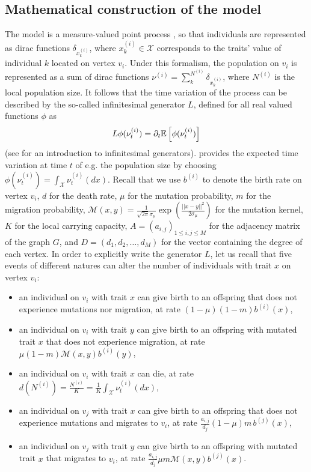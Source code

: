     \subsection{Mathematical construction of the model}\label{secSI:formal_descrip}
    The model is a measure-valued point process \cite{Bansaye2015}, so that individuals are represented as dirac functions $\delta_{x_{k}^{(i)}}$, where $x_{k}^{(i)} \in \mathcal{X}$ corresponds to the traits' value of individual $k$ located on vertex $v_i$.
    Under this formalism, the population on $v_i$ is represented as a sum of dirac functions $\nu^{(i)} = \sum^{N^{(i)}}_k \delta_{x_{k}^{(i)}}$, where $N^{(i)}$ is the local population size. 
    It follows that the time variation of the process can be described by the so-called infinitesimal generator $L$, defined for all real valued functions $\phi$ as
    \begin{equation}\label{eqSI:def_infgen}
         L \phi(\nu^{(i)}_t) = \partial_t {\mathbb{E}} \left[\phi(\nu^{(i)}_t) \right]
    \end{equation}
    (see \cite{Linke2015} for an introduction to infinitesimal generators).  provides the expected time variation at time $t$ of e.g. the population size by choosing $\phi(\nu^{(i)}_t) = \int_\mathcal{X} \nu^{(i)}_t(dx)$.
    Recall that we use
    $b^{(i)}$ to denote the birth rate on vertex $v_i$,
    $d$ for the death rate,
    $\mu$ for the mutation probability,
    $m$ for the migration probability,
    $\mathcal{M}(x,y) = \frac{1}{\sqrt{2\pi}\sigma_\mu} \exp \left(\frac{||x-y||^2}{2\sigma_\mu} \right)$ for the mutation kernel,
    $K$ for the local carrying capacity,
    $A = (a_{i,j})_{1\leq i, j \leq M}$ for the adjacency matrix of the graph $G$, and
    $D = (d_1,d_2,\dots,d_M)$ for the vector containing the degree of each vertex.
    In order to explicitly write the generator $L$,
    let us recall that five events of different natures can alter the number of individuals with trait $x$ on vertex $v_i$:
    \begin{itemize}
        \item an individual on $v_i$ with trait $x$ can give birth to an offspring that does not experience mutations nor migration, at rate $(1 - \mu ) (1 - m) b^{(i)}(x)$,
        \item an individual on $v_i$ with trait $y$ can give birth to an offspring with mutated trait $x$ that does not experience migration, at rate $\mu (1-m) \mathcal{M}(x,y) b^{(i)}(y)$,
        \item an individual on $v_i$ with trait $x$ can die, at rate $d(N^{(i)}) = \frac{N^{(i)}}{K} = \frac{1}{K} \int_\mathcal{X} \nu_t^{(i)} (dx)$,
        \item an individual on $v_j$ with trait $x$ can give birth to an offspring that does not experience mutations and migrates to $v_i$, at rate $ \frac{a_{i,j}}{d_j} (1 - \mu ) m \, b^{(j)}(x)$,
        \item an individual on $v_j$ with trait $y$ can give birth to an offspring with mutated trait $x$ that migrates to $v_i$, at rate $ \frac{a_{i,j}}{d_j} \mu  m \mathcal{M}(x,y) b^{(j)}(x)$.
    \end{itemize}
